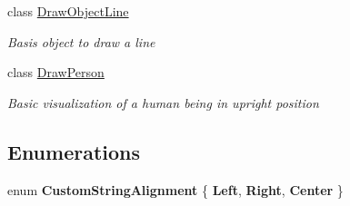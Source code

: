 \begin{DoxyCompactItemize}
class \hyperlink{class_w_p_f_visualization_base_1_1_draw_object_line}{Draw\+Object\+Line}
\begin{DoxyCompactList}\small\item\em Basis object to draw a line \end{DoxyCompactList}\item 
class \hyperlink{class_w_p_f_visualization_base_1_1_draw_person}{Draw\+Person}
\begin{DoxyCompactList}\small\item\em Basic visualization of a human being in upright position \end{DoxyCompactList}\end{DoxyCompactItemize}
\subsection*{Enumerations}
\begin{DoxyCompactItemize}
\item 
enum {\bfseries Custom\+String\+Alignment} \{ {\bfseries Left}, 
{\bfseries Right}, 
{\bfseries Center}
 \}\hypertarget{namespace_w_p_f_visualization_base_ab4ed5a04778cfadd45eef312f0ef7c52}{}\label{namespace_w_p_f_visualization_base_ab4ed5a04778cfadd45eef312f0ef7c52}

\end{DoxyCompactItemize}
